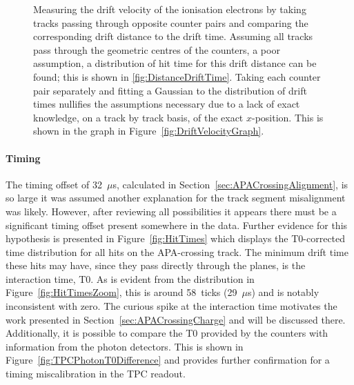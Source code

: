 \begin{figure}
  \caption[Measuring the drift velocity of the ionisation electrons by taking tracks passing through opposite counter pairs and comparing the corresponding drift distance to the drift time.]{Measuring the drift velocity of the ionisation electrons by taking tracks passing through opposite counter pairs and comparing the corresponding drift distance to the drift time.  Assuming all tracks pass through the geometric centres of the counters, a poor assumption, a distribution of hit time for this drift distance can be found; this is shown in \ref{fig:DistanceDriftTime}.  Taking each counter pair separately and fitting a Gaussian to the distribution of drift times nullifies the assumptions necessary due to a lack of exact knowledge, on a track by track basis, of the exact $x$-position.  This is shown in the graph in Figure~\ref{fig:DriftVelocityGraph}.}
  \label{fig:DriftVelocity}
\end{figure}

\paragraph{Timing}

The timing offset of 32~$\mu$s, calculated in Section~\ref{sec:APACrossingAlignment}, is so large it was assumed another explanation for the track segment misalignment was likely.  However, after reviewing all possibilities it appears there must be a significant timing offset present somewhere in the data.  Further evidence for this hypothesis is presented in Figure~\ref{fig:HitTimes} which displays the T0-corrected time distribution for all hits on the APA-crossing track.  The minimum drift time these hits may have, since they pass directly through the planes, is the interaction time, T0.  As is evident from the distribution in Figure~\ref{fig:HitTimesZoom}, this is around 58~ticks (29~$\mu$s) and is notably inconsistent with zero.  The curious spike at the interaction time motivates the work presented in Section~\ref{sec:APACrossingCharge} and will be discussed there.  Additionally, it is possible to compare the T0 provided by the counters with information from the photon detectors.  This is shown in Figure~\ref{fig:TPCPhotonT0Difference} and provides further confirmation for a timing miscalibration in the TPC readout.

